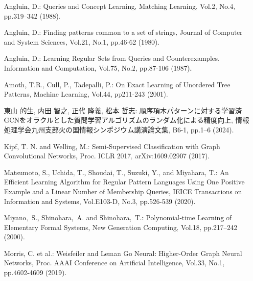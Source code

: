 \begin{thebibliography}{99}

  Angluin, D.:
  Queries and Concept Learning,
  Matching Learning, Vol.2, No.4, pp.319--342 (1988).

  Angluin, D.:
  Finding patterns common to a set of strings,
  Journal of Computer and System Sciences, Vol.21, No.1, pp.46-62 (1980).

  Angluin, D.:
  Learning Regular Sets from Queries and Counterexamples,
  Information and Computation, Vol.75, No.2, pp.87-106 (1987).

  Amoth, T.R., Cull, P., Tadepalli, P.:
  On Exact Learning of Unordered Tree Patterns,
  Machine Learning, Vol.44, pp211-243 (2001).


  東山 的生, 内田 智之, 正代 隆義, 松本 哲志:
  順序項木パターンに対する学習済GCNをオラクルとした質問学習アルゴリズムのランダム化による精度向上,
  情報処理学会九州支部火の国情報シンポジウム講演論文集, B6-1, pp.1--6 (2024).

  Kipf, T. N. and Welling, M.: 
  Semi-Supervised Classification with Graph Convolutional Networks, 
  Proc. ICLR 2017, arXiv:1609.02907 (2017).

  Matsumoto, S., Uchida, T., Shoudai, T., Suzuki, Y., and Miyahara, T.:
  An Efficient Learning Algorithm for Regular Pattern Languages Using One Positive Example and a Linear Number of Membership Queries,
  IEICE Transactions on Information and Systems, Vol.E103-D, No.3, pp.526-539 (2020).


  Miyano,~S., Shinohara,~A. and Shinohara,~T.:
  Polynomial-time Learning of Elementary Formal Systems,
  New Generation Computing, Vol.18, pp.217--242 (2000).

  Morris, C. et al.: 
  Weisfeiler and Leman Go Neural: Higher-Order Graph Neural Networks, 
  Proc. AAAI Conference on Artificial Intelligence, 
  Vol.33, No.1, pp.4602-4609 (2019). 


\end{thebibliography}
